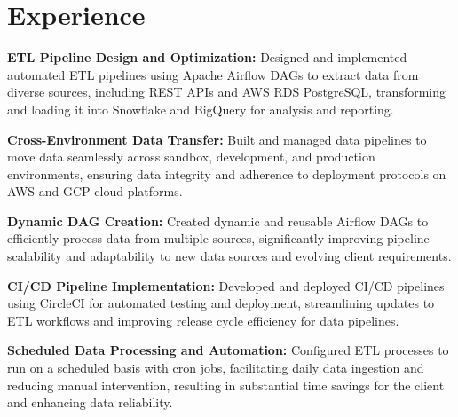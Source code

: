\documentclass[]{deedy-resume-reversed}
\begin{document}
%
%

%
%

%
%

\begin{minipage}[t]{0.60\textwidth}


\section{Experience}
\vspace{\topsep} %
\begin{tightemize}
\item \textbf{ETL Pipeline Design and Optimization:} Designed and implemented automated ETL pipelines using Apache Airflow DAGs to extract data from diverse sources, including REST APIs and AWS RDS PostgreSQL, transforming and loading it into Snowflake and BigQuery for analysis and reporting.
\item \textbf{Cross-Environment Data Transfer:} Built and managed data pipelines to move data 
    seamlessly across sandbox, development, and production environments, ensuring data integrity and 
    adherence to deployment protocols on AWS and GCP cloud platforms.
\item \textbf{Dynamic DAG Creation:} Created dynamic and reusable Airflow DAGs to 
    efficiently process data from multiple sources, significantly improving pipeline 
    scalability and adaptability to new data sources and evolving client requirements.
\item \textbf{CI/CD Pipeline Implementation:} Developed and deployed CI/CD pipelines 
    using CircleCI for automated testing and deployment, streamlining updates to ETL workflows and 
    improving release cycle efficiency for data pipelines.
\item \textbf{Scheduled Data Processing and Automation:} Configured ETL processes to run on a 
            scheduled basis with cron jobs, facilitating daily data ingestion and reducing manual intervention, 
            resulting in substantial time savings for the client and enhancing data reliability.
\end{tightemize}
\sectionsep



\end{minipage}
\end{document}
